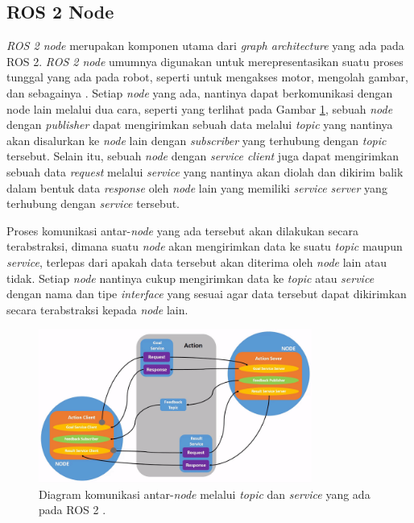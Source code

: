\subsection{ROS 2 Node}
\label{subsec:ros2node}

\emph{ROS 2 node} merupakan komponen utama dari \emph{graph architecture} yang ada pada ROS 2.
\emph{ROS 2 node} umumnya digunakan untuk merepresentasikan suatu proses tunggal yang ada pada robot,
  seperti untuk mengakses motor, mengolah gambar, dan sebagainya \citep{url:understandingros2nodes}.
Setiap \emph{node} yang ada, nantinya dapat berkomunikasi dengan node lain melalui dua cara,
  seperti yang terlihat pada Gambar \ref{fig:diagramnoderos2},
  sebuah \emph{node} dengan \emph{publisher} dapat mengirimkan sebuah data melalui \emph{topic} yang nantinya akan disalurkan ke \emph{node} lain dengan \emph{subscriber} yang terhubung dengan \emph{topic} tersebut.
Selain itu, sebuah \emph{node} dengan \emph{service client} juga dapat mengirimkan sebuah data \emph{request} melalui \emph{service} yang nantinya akan diolah dan dikirim balik dalam bentuk data \emph{response} oleh \emph{node} lain yang memiliki \emph{service server} yang terhubung dengan \emph{service} tersebut.

Proses komunikasi antar-\emph{node} yang ada tersebut akan dilakukan secara terabstraksi,
  dimana suatu \emph{node} akan mengirimkan data ke suatu \emph{topic} maupun \emph{service},
  terlepas dari apakah data tersebut akan diterima oleh \emph{node} lain atau tidak.
Setiap \emph{node} nantinya cukup mengirimkan data ke \emph{topic} atau \emph{service} dengan nama dan tipe \emph{interface} yang sesuai agar data tersebut dapat dikirimkan secara terabstraksi kepada \emph{node} lain.

\begin{figure}
  \centering
  \includegraphics[width=0.8\textwidth,keepaspectratio]{gambar/diagram-node-ros2.png}
  \caption{Diagram komunikasi antar-\emph{node} melalui \emph{topic} dan \emph{service} yang ada pada ROS 2 \citep{url:understandingros2nodes}.}
  \label{fig:diagramnoderos2}
\end{figure}

